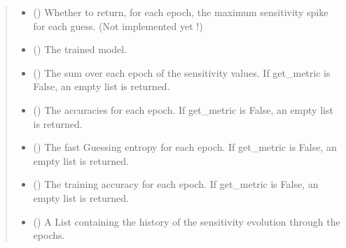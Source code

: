 \documentclass[letterpaper,10pt,english]{sphinxmanual}
\begin{document}
\begin{fulllineitems}
\begin{fulllineitems}
\begin{quote}
\begin{description}
\begin{itemize}
\item {} 
\sphinxAtStartPar
{} (\sphinxstyleliteralemphasis{\sphinxupquote{, }}) \textendash{} Whether to return, for each epoch, the maximum sensitivity spike for each guess. (Not implemented yet !)

\end{itemize}

\sphinxAtStartPar
\begin{itemize}
\item {} 
\sphinxAtStartPar
{} () \textendash{} The trained model.

\item {} 
\sphinxAtStartPar
{} () \textendash{} The sum over each epoch of the sensitivity values. If get\_metric is False, an empty list is returned.

\item {} 
\sphinxAtStartPar
{} () \textendash{} The accuracies for each epoch. If get\_metric is False, an empty list is returned.

\item {} 
\sphinxAtStartPar
{} () \textendash{} The fast Guessing entropy for each epoch. If get\_metric is False, an empty list is returned.

\item {} 
\sphinxAtStartPar
{} () \textendash{} The training accuracy for each epoch. If get\_metric is False, an empty list is returned.

\item {} 
\sphinxAtStartPar
{} () \textendash{} A List containing the history of the sensitivity evolution through the epochs.

\end{itemize}


\end{description}\end{quote}

\end{fulllineitems}


\end{fulllineitems}
\end{document}
